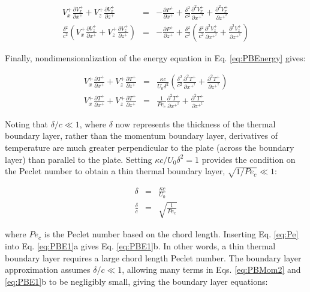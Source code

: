 \documentclass[10pt]{article}
\numberwithin{equation}{section} %
\begin{document}
\begin{subequations}
\label{eq:PBMom2}
\begin{eqnarray}
V_x^+\frac{\partial V_x^+}{\partial x^+}+V_z^+\frac{\partial V_x^+}{\partial z^+}&=&-\frac{\partial P^+}{\partial x^+}+\frac{\delta^2}{c^2}\frac{\partial^2V_x^+}{\partial x^{+^2}}+\frac{\partial^2V_x^+}{\partial z^{+^2}}\\
\frac{\delta^2}{c^2}\left(V_x^+\frac{\partial V_z^+}{\partial x^+}+V_z^+\frac{\partial V_z^+}{\partial z^+}\right)&=&-\frac{\partial P^+}{\partial z^+}+\frac{\delta^2}{c^2}\left(\frac{\delta^2}{c^2}\frac{\partial^2V_z^+}{\partial x^{+^2}}+\frac{\partial^2V_z^+}{\partial z^{+^2}}\right)
\end{eqnarray}
\end{subequations}

Finally, nondimensionalization of the energy equation in Eq. \eqref{eq:PBEnergy} gives:

\begin{subequations}
\label{eq:PBE1}
\begin{eqnarray}
V_x^+\frac{\partial T^+}{\partial x^+}+V_z^+\frac{\partial T^+}{\partial z^+}&=&\frac{\kappa c}{U_0\delta^2}\left(\frac{\delta^2}{c^2}\frac{\partial^2T^+}{\partial x^{+^2}}+\frac{\partial^2T^+}{\partial z^{+^2}}\right)\\
V_x^+\frac{\partial T^+}{\partial x^+}+V_z^+\frac{\partial T^+}{\partial z^+}&=&\frac{1}{Pe_c}\frac{\partial^2T^+}{\partial x^{+^2}}+\frac{\partial^2T^+}{\partial z^{+^2}}
\end{eqnarray}
\end{subequations}

Noting that \(\delta/c\ll1\), where \(\delta\) now represents the thickness of the thermal boundary layer, rather than the momentum boundary layer, derivatives of temperature are much greater perpendicular to the plate (across the boundary layer) than parallel to the plate. Setting \(\kappa c/U_0\delta^2=1\) provides the condition on the Peclet number to obtain a thin thermal boundary layer, \(\sqrt{1/Pe_c}\ll1\):

\begin{subequations}
\label{eq:Pe}
\begin{eqnarray}
\delta&=&\frac{\kappa c}{U_0}\\
\frac{\delta}{c}&=&\sqrt{\frac{1}{Pe_c}}
\end{eqnarray}
\end{subequations}

where \(Pe_c\) is the Peclet number based on the chord length. Inserting Eq. \eqref{eq:Pe} into Eq. \eqref{eq:PBE1}a gives Eq. \eqref{eq:PBE1}b. In other words, a thin thermal boundary layer requires a large chord length Peclet number. The boundary layer approximation assumes \(\delta/c\ll1\), allowing many terms in Eqs. \eqref{eq:PBMom2} and \eqref{eq:PBE1}b to be negligibly small, giving the boundary layer equations:
\end{document}
